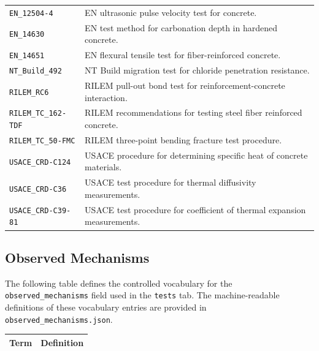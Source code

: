 \documentclass[11pt]{book}
\begin{document}
{\begin{longtable}{p{}p{}}
\texttt{EN\_12504-4} &
EN ultrasonic pulse velocity test for concrete. \\

\texttt{EN\_14630} &
EN test method for carbonation depth in hardened concrete. \\

\texttt{EN\_14651} &
EN flexural tensile test for fiber-reinforced concrete. \\

\texttt{NT\_Build\_492} &
NT Build migration test for chloride penetration resistance. \\

\texttt{RILEM\_RC6} &
RILEM pull-out bond test for reinforcement-concrete interaction. \\

\texttt{RILEM\_TC\_162-TDF} &
RILEM recommendations for testing steel fiber reinforced concrete. \\

\texttt{RILEM\_TC\_50-FMC} &
RILEM three-point bending fracture test procedure. \\

\texttt{USACE\_CRD-C124} &
USACE procedure for determining specific heat of concrete materials. \\

\texttt{USACE\_CRD-C36} &
USACE test procedure for thermal diffusivity measurements. \\

\texttt{USACE\_CRD-C39-81} &
USACE test procedure for coefficient of thermal expansion measurements. \\

\hline
\end{longtable}


\subsection{Observed Mechanisms}
\label{vocab:observed_mechanisms_list}

The following table defines the controlled vocabulary for the \texttt{observed\_mechanisms} field used in the \texttt{tests} tab. The machine-readable definitions of these vocabulary entries are provided in \texttt{observed\_mechanisms.json}.


\begin{longtable}{p{}p{}}
\hline
\textbf{Term} & \textbf{Definition} \\
\hline
\endfirsthead


\end{longtable}}
\end{document}

